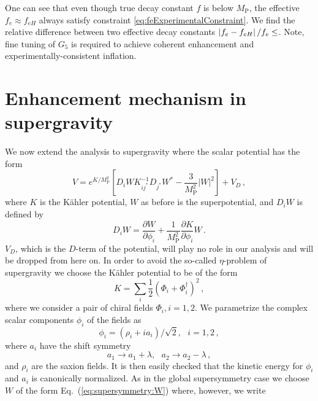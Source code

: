 \documentclass[12pt]{article}
\begin{document}
One can see that even though true decay constant $f$ is below $M_\text{P}$, the effective $f_e \approx f_{eH}$ always satisfy constraint \ref{eq:feExperimentalConstraint}.
We find the relative difference between two effective decay constants $\left|f_e - f_{eH}\right| / f_e \le \protect$.
Note, fine tuning of $G_5$ is required to achieve coherent enhancement and experimentally-consistent inflation.

\section{Enhancement mechanism in supergravity \label{sec:Supergravity}}
We now extend the analysis to supergravity where the scalar potential has the form~\cite{Chamseddine:1982jx, Cremmer:1982en}
\begin{equation} \label{eq:supergravity:potential}
  V = e^{K / M_\text{P}^2} \left[
    D_i W K^{-1}_{ij^*} D_{j^*} W^* - \frac{3}{M_\text{P}^2} \left|W\right|^2
  \right] + V_D\,,
\end{equation}
where $K$ is the K\"ahler potential, $W$ as before is the superpotential, and $D_i W$ is defined by
\begin{equation} \label{eq:supergravity:DW}
  D_i W = \frac{\partial W}{\partial \phi_i}
        + \frac{1}{M_\text{P}^2} \frac{\partial K}{\partial \phi_i} W\,.
\end{equation}
$V_D$, which is the $D$-term of the potential, will play no role in our analysis and will be dropped from here on.
In order to avoid the so-called $\eta$-problem of supergravity we choose the K\"ahler potential to be of the form
\begin{equation}
  K = \sum_i \frac{1}{2} \left(\Phi_i + \Phi_i^\dagger\right)^2\,,
\end{equation}
where we consider a pair of chiral fields $\Phi_i, i = 1, 2$.
We parametrize the complex scalar components $\phi_i$ of the fields as
\begin{equation}
  \phi_i = \left(\rho_i + i a_i\right) / \sqrt 2,
  ~~~ i = 1, 2\,,
\end{equation}
where $a_i$ have the shift symmetry
\begin{equation}
  a_1 \to a_1 + \lambda,
  ~~~ a_2 \to a_2 - \lambda\,,
\end{equation}
and $\rho_i$ are the saxion fields.
It is then easily checked that the kinetic energy for $\phi_i$ and $a_i$ is canonically normalized.
As in the global supersymmetry case we choose $W$ of the form Eq.~(\ref{eq:supersymmetry:W}) where, however, we write
\end{document}
